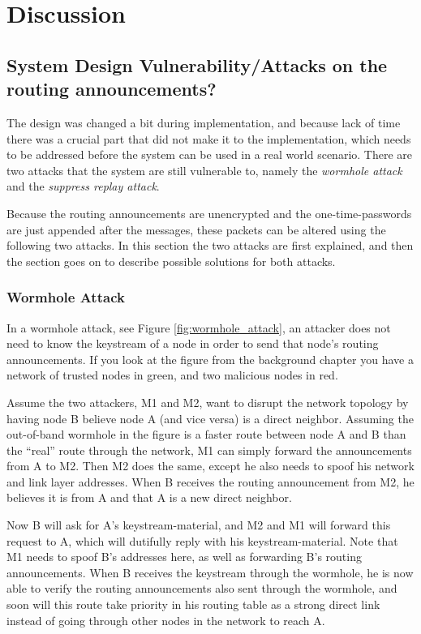 \chapter{Discussion}
\label{ch:discussion}
\acresetall

\section{System Design Vulnerability/Attacks on the routing announcements?}
The design was changed a bit during implementation, and because lack of time
there was a crucial part that did not make it to the implementation, which needs
to be addressed before the system can be used in a real world scenario. There
are two attacks that the system are still vulnerable to, namely the
\emph{wormhole attack} and the \emph{suppress replay attack}.

Because the routing announcements are unencrypted and the one-time-passwords
are just appended after the messages, these packets can be altered using the
following two attacks. In this section the two attacks are first explained, and
then the section goes on to describe possible solutions for both attacks.

\subsection{Wormhole Attack}
In a wormhole attack, see Figure \ref{fig:wormhole_attack}, an attacker does not
need to know the keystream of a node in order to send that node's routing
announcements. If you look at the figure from the background chapter you have a
network of trusted nodes in green, and two malicious nodes in red. 

Assume the two attackers, M1 and M2, want to disrupt the network topology by
having node B believe node A (and vice versa) is a direct neighbor. Assuming the
out-of-band wormhole in the figure is a faster route between node A and B than
the ``real'' route through the network, M1 can simply forward the announcements
from A to M2. Then M2 does the same, except he also needs to spoof his network
and link layer addresses. When B receives the routing announcement from M2, he
believes it is from A and that A is a new direct neighbor.

Now B will ask for A's keystream-material, and M2 and M1 will forward this
request to A, which will dutifully reply with his keystream-material. Note that
M1 needs to spoof B's addresses here, as well as forwarding B's routing
announcements. When B receives the keystream through the wormhole, he is now
able to verify the routing announcements also sent through the wormhole, and
soon will this route take priority in his routing table as a strong direct link
instead of going through other nodes in the network to reach A.

